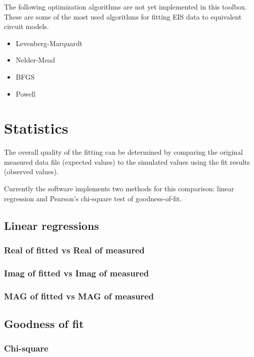 \documentclass[10pt,a4paper,oneside]{book}
\begin{document}
The following optimization algorithms are not yet implemented in this toolbox. These are some of the most used algorithms for fitting EIS data to equivalent circuit models.

\begin{itemize}
	\item Levenberg-Marquardt
	\item Nelder-Mead
	\item BFGS
    \item Powell
\end{itemize}



\chapter{Statistics}

The overall quality of the fitting can be determined by comparing the original measured data file (expected values) to the simulated values using the fit results (observed values).

Currently the software implements two methods for this comparison: linear regression and Pearson's chi-square test of goodness-of-fit.


\section{Linear regressions}



\subsection{Real of fitted vs Real of measured}

\subsection{Imag of fitted vs Imag of measured}

\subsection{MAG of fitted vs MAG of measured}

\section{Goodness of fit}

\subsection{Chi-square}
\end{document}
